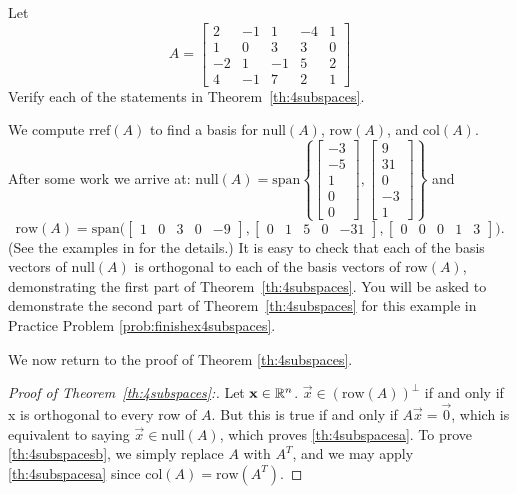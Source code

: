\documentclass{ximera}
\begin{document}
\begin{example}\label{ex:4subspaces}
Let
$$A=\begin{bmatrix}2&-1&1&-4&1\\1&0&3&3&0\\-2&1&-1&5&2\\4&-1&7&2&1\end{bmatrix}$$
Verify each of the statements in Theorem~\ref{th:4subspaces}.

\begin{explanation}
 We compute $\mbox{rref}(A)$ to find a basis for   $\mbox{null}(A)$, $\mbox{row}(A)$, and $\mbox{col}(A)$.  After some work we arrive at:
 $\mbox{null}(A) = \mbox{span}\left\{\begin{bmatrix}-3\\-5\\1\\0\\0\end{bmatrix}, \begin{bmatrix}9\\31\\0\\-3\\1\end{bmatrix}\right\}$ 
 and
 $$\mbox{row}(A)=\mbox{span}\Big(\begin{bmatrix}1&0&3&0&-9\end{bmatrix},
\begin{bmatrix}0&1&5&0&-31\end{bmatrix},
\begin{bmatrix}0&0&0&1&3\end{bmatrix}\Big).$$  (See the examples in  for the details.) It is easy to check that each of the basis vectors of $\mbox{null}(A)$ is orthogonal to each of the basis vectors of $\mbox{row}(A)$, demonstrating the first part of Theorem~\ref{th:4subspaces}.  You will be asked to demonstrate the second part of Theorem~\ref{th:4subspaces} for this example in Practice Problem \ref{prob:finishex4subspaces}.
\end{explanation}
\end{example}

We now return to the proof of Theorem \ref{th:4subspaces}.

\begin{proof}[Proof of Theorem~\ref{th:4subspaces}:]
Let $\mathbf{x}\in\mathbb{R}^n$.  $\vec{x}\in\left(\mbox{row}(A)\right)^\perp$ if and only if x is orthogonal to every row of $A$.  But this is true if and only if $A\vec{x}=\vec{0}$, which is equivalent to saying $\vec{x}\in\mbox{null}(A)$, which proves \ref{th:4subspacesa}.  To prove \ref{th:4subspacesb}, we simply replace $A$ with $A^T$, and we may apply \ref{th:4subspacesa} since $\mbox{col}(A) = \mbox{row}(A^T)$.
\end{proof}
\end{document}
